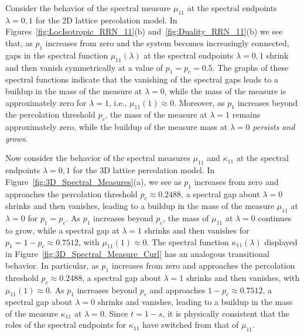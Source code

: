 \documentclass{cmslatex}
\begin{document}
Consider the behavior of the spectral measure $\mu_{11}$ at the spectral
endpoints $\lambda=0,1$ for the 2D lattice percolation model. In
Figures~\ref{fig:LocIsotropic_RRN_11}(b)
and~\ref{fig:Duality_RRN_11}(b) we 
see that, as $p_1$ increases from zero  
and the system becomes increasingly connected, gaps in the spectral
function $\mu_{11}(\lambda)$ at the spectral endpoints $\lambda=0,1$ shrink and then
vanish  symmetrically at a value of $p_1=p_c=0.5$. The graphs of 
these spectral functions indicate that the vanishing of the spectral
gaps leads to a buildup in the mass of the measure at $\lambda=0$, while the
mass of the measure is approximately zero for $\lambda=1$, i.e.,
$\mu_{11}(1)\approx0$. Moreover, as $p_1$ increases beyond the percolation
threshold $p_c$, the mass of the measure at $\lambda=1$ remains
approximately zero, while the buildup of the measure mass at
$\lambda=0$ \emph{persists and grows}. 



Now consider the behavior of the spectral measures $\mu_{11}$ and
$\kappa_{11}$ at the spectral
endpoints $\lambda=0,1$ for the 3D lattice percolation model. In
Figure~\ref{fig:3D_Spectral_Measures}(a), we see as $p_1$ increases
from zero and approaches the percolation threshold $p_c\approx0.2488$, a spectral
gap about $\lambda=0$ shrinks and then vanishes, leading to a
buildup in the mass of the measure $\mu_{11}$ at $\lambda=0$ for $p_1=p_c$. As
$p_1$ increases beyond $p_c$, the mass of $\mu_{11}$ at $\lambda=0$ continues
to grow, while a spectral gap at $\lambda=1$ shrinks and
then vanishes for $p_1=1-p_c\approx0.7512$, with $\mu_{11}(1)\approx0$. The
spectral function $\kappa_{11}(\lambda)$ displayed in
Figure~\ref{fig:3D_Spectral_Measure_Curl} has an analogous
transitional 
behavior. In particular, as $p_1$ increases from zero and approaches
the percolation threshold $p_c\approx0.2488$, a spectral gap about $\lambda=1$
shrinks and then vanishes, with $\mu_{11}(1)\approx0$. As $p_1$ increases
beyond $p_c$ and approaches $1-p_c\approx0.7512$, a spectral gap about $\lambda=0$
shrinks and vanishes, leading to a buildup in the mass of the measure
$\kappa_{11}$ at $\lambda=0$. Since $t=1-s$, it is physically consistent that the
roles of the spectral endpoints for $\kappa_{11}$ have switched from that
of $\mu_{11}$.     
\end{document}
